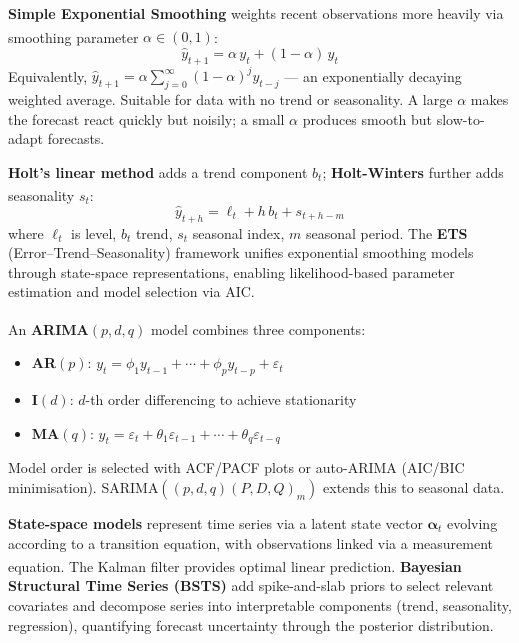 \begin{tcbitemize}[ skin=sectionraster ]

    \tcbitem[title=Exponential Smoothing (SES), raster multicolumn=3]
    \textbf{Simple Exponential Smoothing} weights recent observations more heavily via smoothing parameter $\alpha \in (0,1)$\textsuperscript{\cite[][pp.~75--77]{hyndmanForecastingPrinciples2021}}:
    \begin{equation}
        \hat{y}_{t+1} = \alpha\, y_t + (1-\alpha)\,\hat{y}_t
    \end{equation}
    Equivalently, $\hat{y}_{t+1} = \alpha \sum_{j=0}^{\infty}(1-\alpha)^j y_{t-j}$ --- an exponentially decaying weighted average.
    Suitable for data with no trend or seasonality. A large $\alpha$ makes the forecast react quickly but noisily; a small $\alpha$ produces smooth but slow-to-adapt forecasts.

    \tcbitem[title=Holt-Winters / ETS, raster multicolumn=3]
    \textbf{Holt's linear method} adds a trend component $b_t$; \textbf{Holt-Winters} further adds seasonality $s_t$\textsuperscript{\cite[][pp.~82--95]{hyndmanForecastingPrinciples2021}}:
    \begin{equation}
        \hat{y}_{t+h} = \ell_t + h\,b_t + s_{t+h-m}
    \end{equation}
    where $\ell_t$ is level, $b_t$ trend, $s_t$ seasonal index, $m$ seasonal period.
    The \textbf{ETS} (Error--Trend--Seasonality) framework unifies exponential smoothing models through state-space representations, enabling likelihood-based parameter estimation and model selection via AIC.

    \tcbitem[title=ARIMA Models, raster multicolumn=3]
    An \textbf{ARIMA}$(p,d,q)$ model combines three components\textsuperscript{\cite[][pp.~233--257]{hyndmanForecastingPrinciples2021}}:
    \begin{itemize}
        \item \textbf{AR}$(p)$: $y_t = \phi_1 y_{t-1}+\cdots+\phi_p y_{t-p} + \varepsilon_t$
        \item \textbf{I}$(d)$: $d$-th order differencing to achieve stationarity
        \item \textbf{MA}$(q)$: $y_t = \varepsilon_t + \theta_1\varepsilon_{t-1}+\cdots+\theta_q\varepsilon_{t-q}$
    \end{itemize}
    Model order is selected with ACF/PACF plots or auto-ARIMA (AIC/BIC minimisation).
    SARIMA$((p,d,q)(P,D,Q)_m)$ extends this to seasonal data.

    \tcbitem[title=State-Space and Bayesian Structural Time Series, raster multicolumn=3]
    \textbf{State-space models} represent time series via a latent state vector $\boldsymbol{\alpha}_t$ evolving according to a transition equation, with observations linked via a measurement equation\textsuperscript{\cite[][pp.~293--310]{hyndmanForecastingPrinciples2021}}.
    The Kalman filter provides optimal linear prediction.
    \textbf{Bayesian Structural Time Series (BSTS)} add spike-and-slab priors to select relevant covariates and decompose series into interpretable components (trend, seasonality, regression), quantifying forecast uncertainty through the posterior distribution.


\end{tcbitemize}
